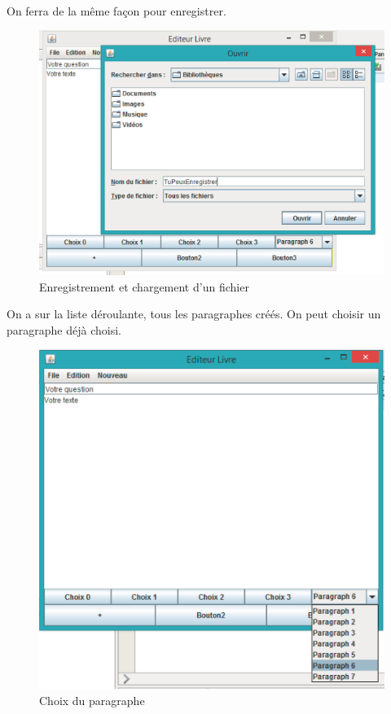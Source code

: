 \documentclass[12pt,a4paper]{article}
\begin{document}
\paragraph{}On ferra de la même façon pour enregistrer.
\begin{figure}[ht]
  \begin{center}
    \includegraphics[width=1.1\textwidth]{./images/edit4.png} 
  \end{center}
  \caption{Enregistrement et chargement d'un fichier}
  \label{fig:mon_image}
\end{figure}

\newpage
On a sur la liste déroulante, tous les paragraphes créés. On peut choisir un paragraphe déjà choisi.
\begin{figure}[ht]
  \begin{center}
    \includegraphics[width=1.0\textwidth]{./images/editF.png} 
  \end{center}
  \caption{ Choix du paragraphe}
  \label{fig:mon_image}
\end{figure}
\newpage
\end{document}

